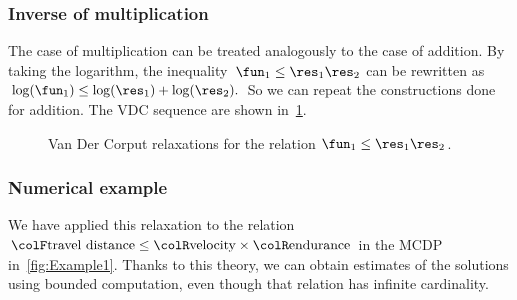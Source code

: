 \subsubsection{Inverse of multiplication}

The case of multiplication can be treated analogously to the case
of addition. By taking the logarithm, the inequality~$\fun_{1}\leq\res_{1}\res_{2}$
can be rewritten as~$\log(\fun_{1})\leq\log(\res_{1})+\log(\res_{2}).$
So we can repeat the constructions done for addition. The VDC sequence
are shown in~\cref{fig:approx_invmult}.

\begin{figure}[h]
\begin{centering}
\par\end{centering}
\caption{\label{fig:approx_invmult}Van Der Corput relaxations for the relation
$\fun_{1}\leq\res_{1}\res_{2}$.}
\end{figure}


\subsubsection{Numerical example}

We have applied this relaxation to the relation ${\colF\text{travel distance}}\leq{\colR\text{velocity}}\times{\colR\text{endurance}}$
in the MCDP in~\cref{fig:Example1}. Thanks to this theory,
we can obtain estimates of the solutions using bounded computation,
even though that relation has infinite cardinality.


